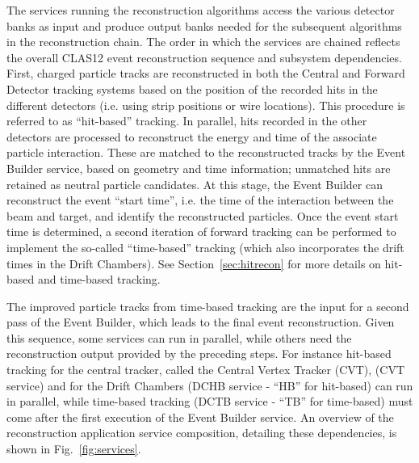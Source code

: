 The services running the reconstruction algorithms access the various detector banks as input and produce output
banks needed for the subsequent algorithms in the reconstruction chain. The order in which the services are
chained reflects the overall CLAS12 event reconstruction sequence and subsystem dependencies. First, charged
particle tracks are reconstructed in both the Central and Forward Detector tracking systems based on the position
of the recorded hits in the different detectors (i.e. using strip positions or wire locations). This procedure is
referred to as ``hit-based'' tracking. In parallel, hits recorded in the other detectors are processed to reconstruct
the energy and time of the associate particle interaction. These are matched to the reconstructed tracks by the
Event Builder service, based on geometry and time information; unmatched hits are retained as neutral particle
candidates. At this stage, the Event Builder can reconstruct the event ``start time'', i.e. the time of the interaction
between the beam and target, and identify the reconstructed particles. Once the event start time is determined, a
second iteration of forward tracking can be performed to implement the so-called ``time-based'' tracking (which
also incorporates the drift times in the Drift Chambers). See Section~\ref{sec:hitrecon} for more details on
hit-based and time-based tracking.

The improved particle tracks from time-based tracking are the input for a second pass of the Event Builder, which
leads to the final event reconstruction. Given this sequence, some services can run in parallel, while others need the
reconstruction output provided by the preceding steps. For instance hit-based tracking for the central tracker,
called the Central Vertex Tracker (CVT), (CVT service) and for the Drift Chambers (DCHB service - ``HB'' for
hit-based) can run in parallel, while time-based tracking (DCTB service - ``TB'' for time-based) must come after
the first execution of the Event Builder service. An overview of the reconstruction application service composition,
detailing these dependencies, is shown in Fig.~\ref{fig:services}.
